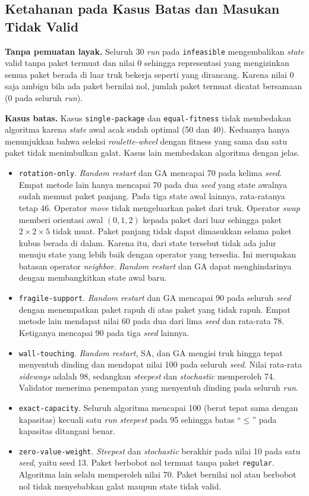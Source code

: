 \subsection{Ketahanan pada Kasus Batas dan Masukan Tidak Valid}

\textbf{Tanpa pemuatan layak.} Seluruh 30 \textit{run} pada \texttt{infeasible} mengembalikan \textit{state} valid tanpa paket termuat dan nilai 0 sehingga representasi yang mengizinkan semua paket berada di luar truk bekerja seperti yang dirancang. Karena nilai 0 saja ambigu bila ada paket bernilai nol, jumlah paket termuat dicatat bersamaan (0 pada seluruh \textit{run}).

\textbf{Kasus batas.} Kasus \texttt{single-package} dan \texttt{equal-fitness} tidak membedakan algoritma karena \textit{state} awal acak sudah optimal (50 dan 40). Keduanya hanya menunjukkan bahwa seleksi \textit{roulette-wheel} dengan fitness yang sama dan satu paket tidak menimbulkan galat. Kasus lain membedakan algoritma dengan jelas.
\begin{itemize}
    \item \texttt{rotation-only}. \textit{Random restart} dan GA mencapai 70 pada kelima \textit{seed}. Empat metode lain hanya mencapai 70 pada dua \textit{seed} yang state awalnya sudah memuat paket panjang. Pada tiga state awal lainnya, rata-ratanya tetap 46. Operator \textit{move} tidak mengeluarkan paket dari truk. Operator \textit{swap} memberi orientasi awal $(0,1,2)$ kepada paket dari luar sehingga paket $2\times2\times5$ tidak muat. Paket panjang tidak dapat dimasukkan selama paket kubus berada di dalam. Karena itu, dari state tersebut tidak ada jalur menuju state yang lebih baik dengan operator yang tersedia. Ini merupakan batasan operator \textit{neighbor}. \textit{Random restart} dan GA dapat menghindarinya dengan membangkitkan state awal baru.
    \item \texttt{fragile-support}. \textit{Random restart} dan GA mencapai 90 pada seluruh \textit{seed} dengan menempatkan paket rapuh di atas paket yang tidak rapuh. Empat metode lain mendapat nilai 60 pada dua dari lima \textit{seed} dan rata-rata 78. Ketiganya mencapai 90 pada tiga \textit{seed} lainnya.
    \item \texttt{wall-touching}. \textit{Random restart}, SA, dan GA mengisi truk hingga tepat menyentuh dinding dan mendapat nilai 100 pada seluruh \textit{seed}. Nilai rata-rata \textit{sideways} adalah 98, sedangkan \textit{steepest} dan \textit{stochastic} memperoleh 74. Validator menerima penempatan yang menyentuh dinding pada seluruh \textit{run}.
    \item \texttt{exact-capacity}. Seluruh algoritma mencapai 100 (berat tepat sama dengan kapasitas) kecuali satu \textit{run} \textit{steepest} pada 95 sehingga batas ``$\leq$'' pada kapasitas ditangani benar.
    \item \texttt{zero-value-weight}. \textit{Steepest} dan \textit{stochastic} berakhir pada nilai 10 pada satu \textit{seed}, yaitu seed 13. Paket berbobot nol termuat tanpa paket \texttt{regular}. Algoritma lain selalu memperoleh nilai 70. Paket bernilai nol atau berbobot nol tidak menyebabkan galat maupun state tidak valid.
\end{itemize}

